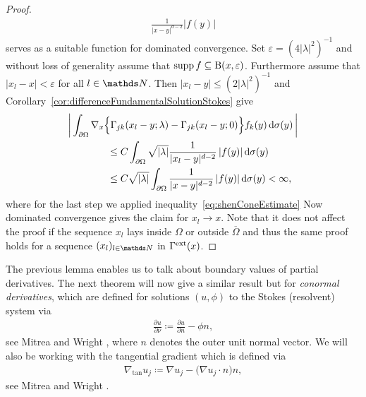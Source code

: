 \begin{proof}
  \begin{align*}
    \frac{1}{|x -y|^{d - 2}} |f(y)|
  \end{align*}
  serves as a suitable function for dominated convergence.
  Set $\varepsilon = (4 |\lambda|^2)^{-1}$ and without loss of generality assume that $\operatorname{supp} f \subseteq \mathrm{B}(x,\varepsilon)$.
  Furthermore assume that $|x_l - x| < \varepsilon$ for all $l \in \N$.
  Then $|x_l - y| \leq (2|\lambda|^2)^{-1}$ and Corollary~\ref{cor:differenceFundamentalSolutionStokes} give
  \begin{align*}
    &\bigg| \int_{\partial\Omega} \nabla_x \Big\{ \Gamma_{jk}(x_l - y; \lambda) - \Gamma_{jk}(x_l - y; 0)\Big\} f_k(y) \, {\operatorname{d}\!{\sigma}}(y)\, \bigg| \\
    &\qquad\qquad\leq C \int_{\partial\Omega} \sqrt{|\lambda|} \frac{1}{|x_l - y|^{d - 2}}\, |f(y)| \, {\operatorname{d}\!{\sigma}}(y) \\
    &\qquad\qquad\leq {C} \sqrt{|\lambda|} \int_{\partial\Omega} \frac{1}{|x - y|^{d - 2}}\, |f(y)| \, {\operatorname{d}\!{\sigma}}(y) < \infty,
  \end{align*}
  where for the last step we applied inequality~\eqref{eq:shenConeEstimate}
  Now dominated convergence gives the claim for $x_l \to x$.
  Note that it does not affect the proof if the sequence $x_l$ lays inside $\Omega$ or outside $\overline\Omega$ and thus the same proof holds for a sequence $(x_l)_{l \in \N}$ in $\Gamma^{\mathrm{ext}}(x)$.
\end{proof}

The previous lemma enables us to talk about boundary values of partial derivatives. 
The next theorem will now give a similar result but for \emph{conormal derivatives}, which are defined for solutions $(u,\phi)$ to the Stokes (resolvent) system via 
\begin{align}
  \label{eq:conormalDerivative}
  \frac{\partial u}{\partial \nu} \coloneqq \frac{\partial u}{\partial n} - \phi n,
\end{align}
see Mitrea and Wright \cite[Eq.\@~(1.2)]{mitreaWright}, where $n$ denotes the outer unit normal vector.
We will also be working with the tangential gradient which is defined via
\begin{align}
  \label{eq:tangentialGradient}
  \nabla_{\mathrm{tan}} u_j \coloneqq \nabla u_j - \big(\nabla u_j \cdot  n\big) n,
\end{align}
see Mitrea and Wright \cite[p.\@~17]{mitreaWright}.

